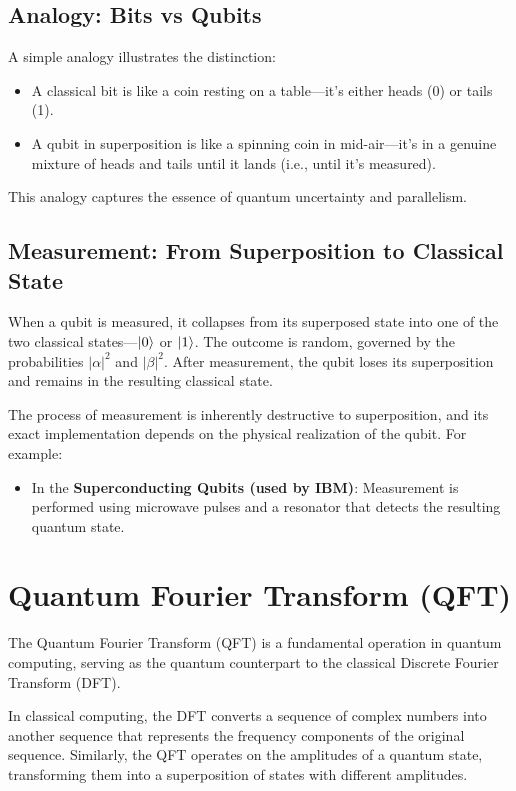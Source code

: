 \documentclass{article}
\begin{document}
\subsection{Analogy: Bits vs Qubits}
A simple analogy illustrates the distinction:

\begin{itemize}
    \item A classical bit is like a coin resting on a table---it's either heads (0) or tails (1).
    \item A qubit in superposition is like a spinning coin in mid-air---it's in a genuine mixture of heads and tails until it lands (i.e., until it's measured).
\end{itemize}

This analogy captures the essence of quantum uncertainty and parallelism.

\subsection{Measurement: From Superposition to Classical State}
When a qubit is measured, it collapses from its superposed state into one of the two classical states---$\ket{0}$ or $\ket{1}$. The outcome is random, governed by the probabilities $|\alpha|^2$ and $|\beta|^2$. After measurement, the qubit loses its superposition and remains in the resulting classical state.

The process of measurement is inherently destructive to superposition, and its exact implementation depends on the physical realization of the qubit. For example:

\begin{itemize}
    \item In the \textbf{Superconducting Qubits (used by IBM)}: Measurement is performed using microwave pulses and a resonator that detects the resulting quantum state.
\end{itemize}


\section{Quantum Fourier Transform (QFT)}

\begin{infobox}[title=QFT Overview]
    The Quantum Fourier Transform (QFT) is a fundamental operation in quantum computing, serving as the quantum counterpart to the classical Discrete Fourier Transform (DFT).

    In classical computing, the DFT converts a sequence of complex numbers into another sequence that represents the frequency components of the original sequence. Similarly, the QFT operates on the amplitudes of a quantum state, transforming them into a superposition of states with different amplitudes.
\end{infobox}
\end{document}
